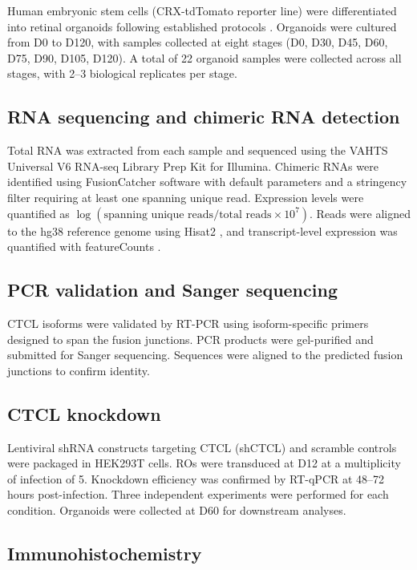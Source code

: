 \documentclass[11pt]{article}
\begin{document}
Human embryonic stem cells (CRX-tdTomato reporter line) were differentiated into retinal organoids following established protocols \citep{nakano2012retinal, zhong2014generation}. Organoids were cultured from D0 to D120, with samples collected at eight stages (D0, D30, D45, D60, D75, D90, D105, D120). A total of 22 organoid samples were collected across all stages, with 2--3 biological replicates per stage.

\subsection{RNA sequencing and chimeric RNA detection}

Total RNA was extracted from each sample and sequenced using the VAHTS Universal V6 RNA-seq Library Prep Kit for Illumina. Chimeric RNAs were identified using FusionCatcher software \citep{nicorici2014fusioncatcher} with default parameters and a stringency filter requiring at least one spanning unique read. Expression levels were quantified as $\log(\text{spanning unique reads} / \text{total reads} \times 10^{7})$. Reads were aligned to the hg38 reference genome using Hisat2 \citep{kim2019hisat2}, and transcript-level expression was quantified with featureCounts \citep{liao2014featurecounts}.

\subsection{PCR validation and Sanger sequencing}

CTCL isoforms were validated by RT-PCR using isoform-specific primers designed to span the fusion junctions. PCR products were gel-purified and submitted for Sanger sequencing. Sequences were aligned to the predicted fusion junctions to confirm identity.

\subsection{CTCL knockdown}

Lentiviral shRNA constructs targeting CTCL (shCTCL) and scramble controls were packaged in HEK293T cells. ROs were transduced at D12 at a multiplicity of infection of 5. Knockdown efficiency was confirmed by RT-qPCR at 48--72 hours post-infection. Three independent experiments were performed for each condition. Organoids were collected at D60 for downstream analyses.

\subsection{Immunohistochemistry}
\end{document}
